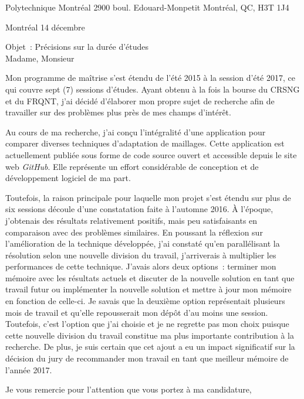 \clurecipient
 {Polytechnique Montréal}
 {2900 boul. Edouard-Monpetit}
 {Montréal, QC, H3T 1J4}
 
\cllocationdate
 {Montréal}
 {14 décembre}
 
Objet~: Précisions sur la durée d'études\\
 
\clgreeting
 {Madame, Monsieur}
 
Mon programme de maîtrise s'est étendu de l'été 2015 à la session d'été 2017, ce qui couvre sept (7) sessions d'études. Ayant obtenu à la fois la bourse du CRSNG et du FRQNT, j'ai décidé d'élaborer mon propre sujet de recherche afin de travailler sur des problèmes plus près de mes champs d'intérêt.

Au cours de ma recherche, j'ai conçu l'intégralité d'une application pour comparer diverses techniques d'adaptation de maillages. Cette application est actuellement publiée sous forme de code source ouvert et accessible depuis le site web \textit{GitHub}. Elle représente un effort considérable de conception et de développement logiciel de ma part.

Toutefois, la raison principale pour laquelle mon projet s'est étendu sur plus de six sessions découle d'une constatation faite à l'automne 2016. À l'époque, j'obtenais des résultats relativement positifs, mais peu satisfaisants en comparaison avec des problèmes similaires. En poussant la réflexion sur l'amélioration de la technique développée, j'ai constaté qu'en parallélisant la résolution selon une nouvelle division du travail, j'arriverais à multiplier les performances de cette technique. J'avais alors deux options~: terminer mon mémoire avec les résultats actuels et discuter de la nouvelle solution en tant que travail futur ou implémenter la nouvelle solution et mettre à jour mon mémoire en fonction de celle-ci. Je savais que la deuxième option représentait plusieurs mois de travail et qu'elle repousserait mon dépôt d'au moins une session. Toutefois, c'est l'option que j'ai choisie et je ne regrette pas mon choix puisque cette nouvelle division du travail constitue ma plus importante contribution à la recherche. De plus, je suis certain que cet ajout a eu un impact significatif sur la décision du jury de recommander mon travail en tant que meilleur mémoire de l'année 2017.

Je vous remercie pour l'attention que vous portez à ma candidature,

